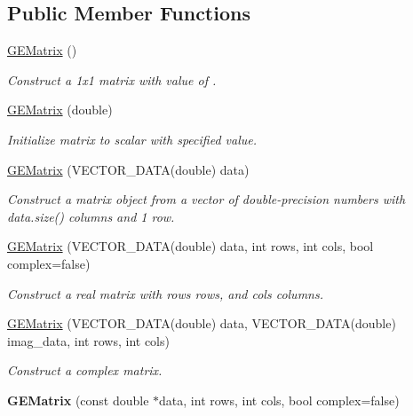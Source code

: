 \subsection*{Public Member Functions}
\begin{DoxyCompactItemize}
\item 
\hyperlink{class_g_e_matrix_a8efdf9ec85fdcfa0e9f1317722e81c52}{G\-E\-Matrix} ()
\begin{DoxyCompactList}\small\item\em Construct a {\ttfamily 1x1} matrix with value of {}. \end{DoxyCompactList}\item 
\hyperlink{class_g_e_matrix_af9ebcc214a2086c4692fa107c3ee53e9}{G\-E\-Matrix} (double)
\begin{DoxyCompactList}\small\item\em Initialize matrix to scalar with specified value. \end{DoxyCompactList}\item 
\hyperlink{class_g_e_matrix_a3bb7449ba121b12b1944b96ecae38cdc}{G\-E\-Matrix} (V\-E\-C\-T\-O\-R\-\_\-\-D\-A\-T\-A(double) data)
\begin{DoxyCompactList}\small\item\em Construct a matrix object from a vector of double-\/precision numbers with {\ttfamily data.\-size()} columns and 1 row. \end{DoxyCompactList}\item 
\hyperlink{class_g_e_matrix_a9ae1f7a7a5fe51d899d14ce95d02f420}{G\-E\-Matrix} (V\-E\-C\-T\-O\-R\-\_\-\-D\-A\-T\-A(double) data, int rows, int cols, bool complex=false)
\begin{DoxyCompactList}\small\item\em Construct a real matrix with {\itshape rows} rows, and {\itshape cols} columns. \end{DoxyCompactList}\item 
\hyperlink{class_g_e_matrix_a07bcbe0a34646e2003f178e7b613bfaa}{G\-E\-Matrix} (V\-E\-C\-T\-O\-R\-\_\-\-D\-A\-T\-A(double) data, V\-E\-C\-T\-O\-R\-\_\-\-D\-A\-T\-A(double) imag\-\_\-data, int rows, int cols)
\begin{DoxyCompactList}\small\item\em Construct a complex matrix. \end{DoxyCompactList}\item 
\hypertarget{class_g_e_matrix_afae9a114a173fbdcb445c6427d02f31c}{{\bfseries G\-E\-Matrix} (const double $\ast$data, int rows, int cols, bool complex=false)}\label{class_g_e_matrix_afae9a114a173fbdcb445c6427d02f31c}


\end{DoxyCompactItemize}
